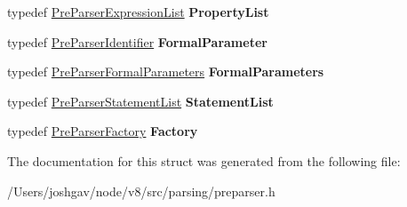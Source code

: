 \begin{DoxyCompactItemize}
\item 
typedef \hyperlink{classv8_1_1internal_1_1_pre_parser_list}{Pre\+Parser\+Expression\+List} {\bfseries Property\+List}\hypertarget{structv8_1_1internal_1_1_pre_parser_traits_1_1_type_a9172f99158c4c5103827d6e3c16d64a7}{}\label{structv8_1_1internal_1_1_pre_parser_traits_1_1_type_a9172f99158c4c5103827d6e3c16d64a7}

\item 
typedef \hyperlink{classv8_1_1internal_1_1_pre_parser_identifier}{Pre\+Parser\+Identifier} {\bfseries Formal\+Parameter}\hypertarget{structv8_1_1internal_1_1_pre_parser_traits_1_1_type_a4d236392815a597957b86c53e302d733}{}\label{structv8_1_1internal_1_1_pre_parser_traits_1_1_type_a4d236392815a597957b86c53e302d733}

\item 
typedef \hyperlink{structv8_1_1internal_1_1_pre_parser_formal_parameters}{Pre\+Parser\+Formal\+Parameters} {\bfseries Formal\+Parameters}\hypertarget{structv8_1_1internal_1_1_pre_parser_traits_1_1_type_af1a62bd9828d167a519f0319ef8334df}{}\label{structv8_1_1internal_1_1_pre_parser_traits_1_1_type_af1a62bd9828d167a519f0319ef8334df}

\item 
typedef \hyperlink{classv8_1_1internal_1_1_pre_parser_list}{Pre\+Parser\+Statement\+List} {\bfseries Statement\+List}\hypertarget{structv8_1_1internal_1_1_pre_parser_traits_1_1_type_a58d876eeb90dee667f745677fab14379}{}\label{structv8_1_1internal_1_1_pre_parser_traits_1_1_type_a58d876eeb90dee667f745677fab14379}

\item 
typedef \hyperlink{classv8_1_1internal_1_1_pre_parser_factory}{Pre\+Parser\+Factory} {\bfseries Factory}\hypertarget{structv8_1_1internal_1_1_pre_parser_traits_1_1_type_a7bcefb48652297497c8d50c80f0e10fc}{}\label{structv8_1_1internal_1_1_pre_parser_traits_1_1_type_a7bcefb48652297497c8d50c80f0e10fc}

\end{DoxyCompactItemize}


The documentation for this struct was generated from the following file\+:\begin{DoxyCompactItemize}
\item 
/\+Users/joshgav/node/v8/src/parsing/preparser.\+h\end{DoxyCompactItemize}
